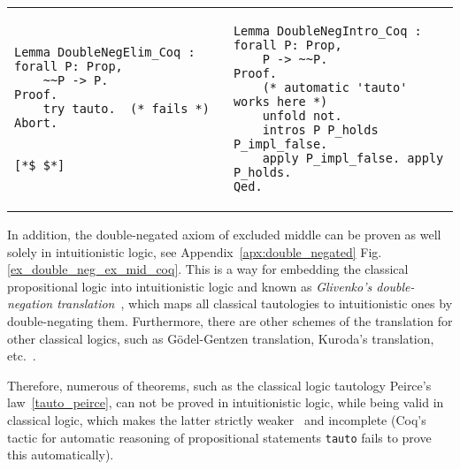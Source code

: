 \documentclass[article]{aaltoseries}
\begin{document}
\begin{raggedleft}
\begin{tabular}{p{.45\linewidth} p{.45\linewidth}}
\begin{lstlisting}[language=coq,
    caption={Proof failure of the \eqref{rule_double_negation_elim} rule in Coq},
    label=ex_double_neg_elim_coq]
Lemma DoubleNegElim_Coq : forall P: Prop,
    ~~P -> P.
Proof.
    try tauto.  (* fails *)
Abort.


[*$ $*]
\end{lstlisting} %
&
\begin{lstlisting}[language=coq,
    caption={Proof of the \eqref{rule_double_negation_elim} rule in Coq},
    label=ex_double_neg_intro_coq]
Lemma DoubleNegIntro_Coq : forall P: Prop,
    P -> ~~P.
Proof.
    (* automatic 'tauto' works here *)
    unfold not.
    intros P P_holds P_impl_false.
    apply P_impl_false. apply P_holds. 
Qed.
\end{lstlisting}
\end{tabular}
\end{raggedleft}

In addition, the double-negated axiom of excluded middle can be proven as well solely in intuitionistic logic, see Appendix~\ref{apx:double_negated} Fig.\ref{ex_double_neg_ex_mid_coq}. This is a way for embedding the classical propositional logic into intuitionistic logic and known as \textit{Glivenko's double-negation translation}~\cite{Glivenko29}, which maps all classical tautologies to intuitionistic ones by double-negating them. Furthermore, there are other schemes of the translation for other classical logics, such as Gödel-Gentzen translation, Kuroda's translation, etc.~\cite{Kolmogorov25}.

Therefore, numerous of theorems, such as the classical logic tautology Peirce's law~\eqref{tauto_peirce}, can not be proved in intuitionistic logic, while being valid in classical logic, which makes the latter strictly weaker~\cite{Rush14} and incomplete (Coq's tactic for automatic reasoning of propositional statements \texttt{tauto} fails to prove this automatically).
\end{document}
